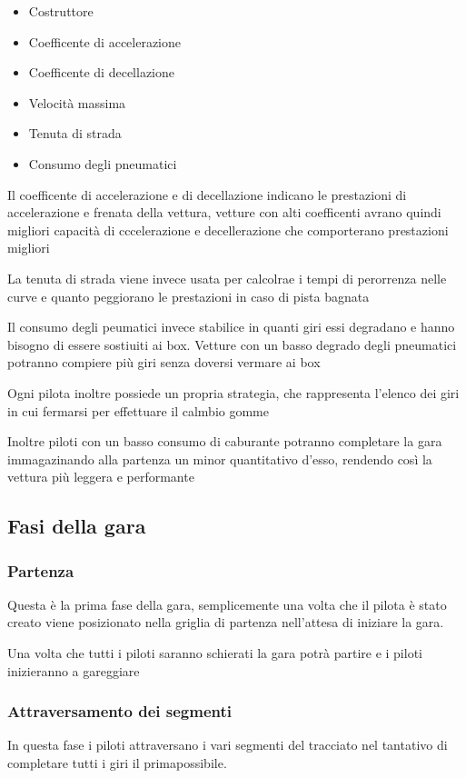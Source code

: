 \documentclass[a4paper,11pt, twoside]{book}
\begin{document}
      \begin{itemize}
	\item Costruttore
	\item Coefficente di accelerazione
	\item Coefficente di decellazione
	\item Velocità massima
	\item Tenuta di strada
	\item Consumo degli pneumatici
      \end{itemize}
      
      Il coefficente di accelerazione e di decellazione indicano le prestazioni di accelerazione e frenata della vettura, 
      vetture con alti coefficenti avrano quindi migliori capacità di cccelerazione e decellerazione
      che comporterano prestazioni migliori
      
      La tenuta di strada viene invece usata per calcolrae i tempi di perorrenza nelle curve e quanto peggiorano 
      le prestazioni in caso di pista bagnata
      
      Il consumo degli peumatici invece stabilice in quanti giri essi degradano e hanno bisogno di essere sostiuiti
      ai box. Vetture con un basso degrado degli pneumatici potranno compiere più giri senza doversi vermare ai box
      
      Ogni pilota inoltre possiede un propria strategia, che rappresenta l'elenco dei giri in cui fermarsi per effettuare il
      calmbio gomme
      
      Inoltre piloti con un basso consumo di caburante potranno completare la gara immagazinando alla partenza un minor
      quantitativo d'esso, rendendo così la vettura più leggera e performante
      
      \subsection{Fasi della gara}
	\subsubsection{Partenza}
	  Questa è la prima fase della gara, semplicemente una volta che il pilota è stato creato
	  viene posizionato nella griglia di partenza nell'attesa di iniziare la gara.
	  
	  Una volta che tutti i piloti saranno schierati la gara potrà partire e i piloti inizieranno a gareggiare
	  
	\subsubsection{Attraversamento dei segmenti}
	  In questa fase i piloti attraversano i vari segmenti del tracciato nel tantativo di completare tutti i giri
	  il primapossibile.
	  
\end{document}

